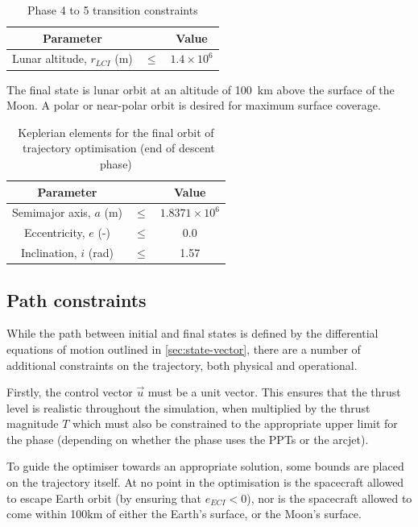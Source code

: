 \begin{table}[h]
\caption{Phase 4 to 5 transition constraints}
\label{tab:Phase-4-5-constraints}
\begin{center}
\begin{tabular} {ccc}\toprule
Parameter && Value\\\midrule
Lunar altitude, $r_{LCI}$ (m) &$\le$& $1.4\times 10^6$\\\bottomrule
\end{tabular}
\end{center}
\end{table}

The final state is lunar orbit at an altitude of 100~km above the surface of the Moon. A polar or near-polar orbit is desired for maximum surface coverage.

\begin{table}[h]
\caption{Keplerian elements for the final orbit of \BW\ trajectory optimisation (end of descent phase)}
\label{tab:Phase-5-constraints}
\begin{center}
\begin{tabular} {ccc}\toprule
Parameter && Value\\\midrule
Semimajor axis, $a$ (m) &$\le$& $1.8371\times 10^6$\\
Eccentricity, $e$ (-) &$\le$& 0.0\\
Inclination, $i$ (rad) &$\le$& 1.57\\\bottomrule
\end{tabular}
\end{center}
\end{table}

\subsection{Path constraints} \label{sub:Path-constraints}

While the path between initial and final states is defined by the differential equations of motion outlined in \autoref{sec:state-vector}, there are a number of additional constraints on the trajectory, both physical and operational.

Firstly, the control vector $\vec{u}$ must be a unit vector. This ensures that the thrust level is realistic throughout the simulation, when multiplied by the thrust magnitude $T$ which must also be constrained to the appropriate upper limit for the phase (depending on whether the phase uses the PPTs or the arcjet).

To guide the optimiser towards an appropriate solution, some bounds are placed on the trajectory itself. At no point in the optimisation is the spacecraft allowed to escape Earth orbit (by ensuring that $e_{ECI}<0$), nor is the spacecraft allowed to come within 100km of either the Earth's surface, or the Moon's surface.

